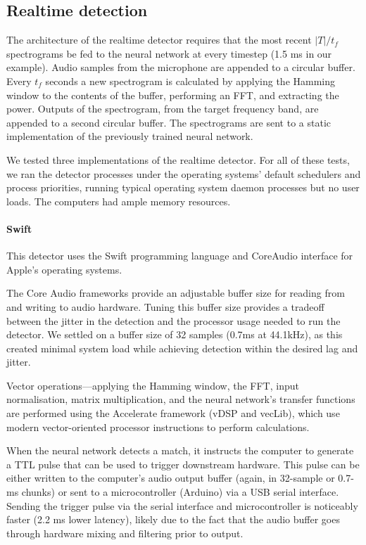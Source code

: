 \documentclass[10pt,letterpaper]{article}
\renewcommand{\subsubsection}[1]{\paragraph{#1}}
\begin{document}
\subsection{Realtime detection}

The architecture of the realtime detector requires that the most
recent $|T|/t_f$ spectrograms be fed to the neural network at every
timestep (1.5 ms in our example).  Audio samples from the microphone
are appended to a circular buffer.  Every $t_f$ seconds a new
spectrogram is calculated by applying the Hamming window to the
contents of the buffer, performing an FFT, and extracting the
power. Outputs of the spectrogram, from the target frequency band, are
appended to a second circular buffer.  The spectrograms are sent to a
static implementation of the previously trained neural network.

We tested three implementations of the realtime detector.  For all of
these tests, we ran the detector processes under the operating
systems' default schedulers and process priorities, running typical
operating system daemon processes but no user loads.  The computers
had ample memory resources.

\subsubsection{Swift}

This detector uses the Swift programming language and CoreAudio
interface for Apple's operating systems.

The Core Audio frameworks provide an adjustable buffer size for 
reading from and writing to audio hardware. Tuning this buffer size
provides a tradeoff between the jitter in the detection and the 
processor usage needed to run the detector. We settled on a buffer 
size of 32 samples (0.7ms at 44.1kHz), as this created minimal system
load while achieving detection within the desired lag and jitter.

Vector operations---applying the Hamming window, the FFT, input
normalisation, matrix multiplication, and the neural network's
transfer functions are performed using the Accelerate framework (vDSP
and vecLib), which use modern vector-oriented processor instructions
to perform calculations.

When the neural network detects a match, it instructs the computer to
generate a TTL pulse that can be used to trigger downstream hardware.
This pulse can be either written to the computer's audio output buffer (again, in
32-sample or 0.7-ms chunks) or sent to a microcontroller (Arduino) via
a USB serial interface. Sending the trigger pulse via the serial
interface and microcontroller is noticeably faster (2.2 ms lower
latency), likely due to the fact that the audio buffer goes through
hardware mixing and filtering prior to output.
\end{document}

